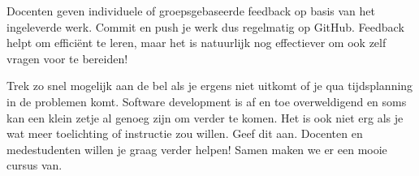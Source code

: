 Docenten geven individuele of groepsgebaseerde feedback
op basis van het ingeleverde werk. Commit en push je werk dus regelmatig
op GitHub. Feedback helpt om efficiënt te leren, 
maar het is natuurlijk nog effectiever om ook zelf vragen voor te bereiden! 

Trek zo snel mogelijk aan de bel als je ergens niet uitkomt of 
je qua tijdsplanning in de problemen komt.
Software development is af en toe overweldigend en soms kan een 
klein zetje al genoeg zijn om verder te komen. Het is ook niet erg
als je wat meer toelichting of instructie zou willen. Geef dit aan.
Docenten en medestudenten willen je graag verder helpen!
Samen maken we er een mooie cursus van.